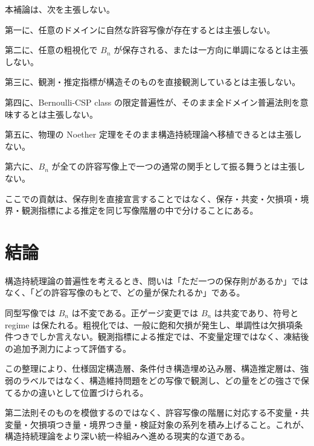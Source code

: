 \documentclass[12pt,a4paper]{article}
\begin{document}
本補論は、次を主張しない。

第一に、任意のドメインに自然な許容写像が存在するとは主張しない。

第二に、任意の粗視化で \(B_{n}\) が保存される、または一方向に単調になるとは主張しない。

第三に、観測・推定指標が構造そのものを直接観測しているとは主張しない。

第四に、Bernoulli-CSP class の限定普遍性が、そのまま全ドメイン普遍法則を意味するとは主張しない。

第五に、物理の Noether 定理をそのまま構造持続理論へ移植できるとは主張しない。

第六に、\(B_{n}\) が全ての許容写像上で一つの通常の関手として振る舞うとは主張しない。

ここでの貢献は、保存則を直接宣言することではなく、保存・共変・欠損項・境界・観測指標による推定を同じ写像階層の中で分けることにある。

\section{結論}\label{ux7d50ux8ad6}

構造持続理論の普遍性を考えるとき、問いは「ただ一つの保存則があるか」ではなく、「どの許容写像のもとで、どの量が保たれるか」である。

同型写像では \(B_{n}\) は不変である。正ゲージ変更では \(B_{n}\) は共変であり、符号と regime は保たれる。粗視化では、一般に飽和欠損が発生し、単調性は欠損項条件つきでしか言えない。観測指標による推定では、不変量定理ではなく、凍結後の追加予測力によって評価する。

この整理により、仕様固定構造層、条件付き構造埋め込み層、構造推定層は、強弱のラベルではなく、構造維持問題をどの写像で観測し、どの量をどの強さで保てるかの違いとして位置づけられる。

第二法則そのものを模倣するのではなく、許容写像の階層に対応する不変量・共変量・欠損項つき量・境界つき量・検証対象の系列を積み上げること。これが、構造持続理論をより深い統一枠組みへ進める現実的な道である。
\end{document}
